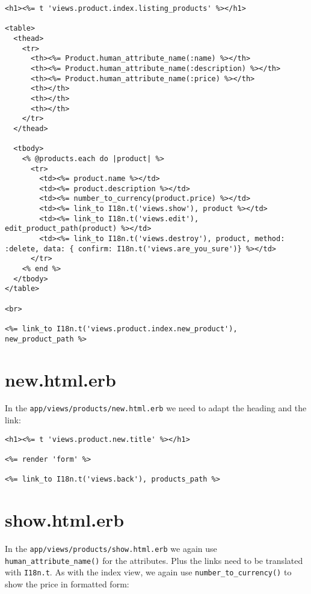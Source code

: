 \documentclass[a4paper]{book}
\newcounter{tab}[chapter]
\begin{document}
\begin{shaded}\begin{verbatim}
<h1><%= t 'views.product.index.listing_products' %></h1>

<table>
  <thead>
    <tr>
      <th><%= Product.human_attribute_name(:name) %></th>
      <th><%= Product.human_attribute_name(:description) %></th>
      <th><%= Product.human_attribute_name(:price) %></th>
      <th></th>
      <th></th>
      <th></th>
    </tr>
  </thead>

  <tbody>
    <% @products.each do |product| %>
      <tr>
        <td><%= product.name %></td>
        <td><%= product.description %></td>
        <td><%= number_to_currency(product.price) %></td>
        <td><%= link_to I18n.t('views.show'), product %></td>
        <td><%= link_to I18n.t('views.edit'), edit_product_path(product) %></td>
        <td><%= link_to I18n.t('views.destroy'), product, method: :delete, data: { confirm: I18n.t('views.are_you_sure')} %></td>
      </tr>
    <% end %>
  </tbody>
</table>

<br>

<%= link_to I18n.t('views.product.index.new_product'), new_product_path %>
\end{verbatim}\end{shaded}

\section{new.html.erb}\label{new.html.erb}

In the \texttt{app/views/products/new.html.erb} we need to adapt the heading and the link:

\begin{shaded}\begin{verbatim}
<h1><%= t 'views.product.new.title' %></h1>

<%= render 'form' %>

<%= link_to I18n.t('views.back'), products_path %>
\end{verbatim}\end{shaded}

\section{show.html.erb}\label{show.html.erb}

In the \texttt{app/views/products/show.html.erb} we again use \texttt{human\_attribute\_name()} for the attributes. Plus the links need to be translated with \texttt{I18n.t}. As with the index view, we again use \texttt{number\_to\_currency()} to show the price in formatted form:
\end{document}
